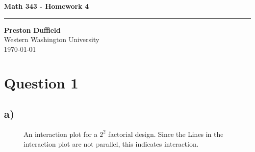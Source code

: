 \documentclass{article}
\begin{document}
\noindent
\begin{minipage}[t]{0.6\textwidth}
    \begin{flushleft}
        \LARGE\textbf{Math 343 - Homework 4} \\
        \vspace{6pt} %
        \hrule width 10cm
        \vspace{12pt}
        \large\textbf{Preston Duffield} \\
        \large Western Washington University \\
        \today
        \vspace{24pt}
    \end{flushleft}
\end{minipage}

\section*{Question 1}

\subsection*{a)}
\begin{figure}[H]
    \centering
    \caption{ An interaction plot for a $2^2$ factorial design. Since the Lines in the interaction plot are not parallel, this indicates interaction. }
\end{figure}
\end{document}
